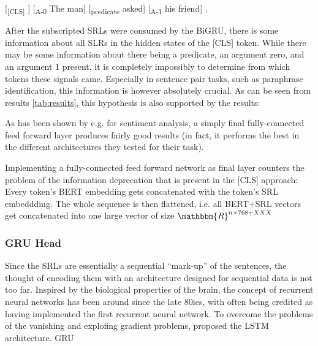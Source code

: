 [\textsubscript{[CLS]} ] [\textsubscript{A-0} The man] [\textsubscript{predicate} asked] [\textsubscript{A-1} his friend] .

After the subscripted SRLs were consumed by the BiGRU, there is some information about all
SLRs in the hidden states of the [CLS] token. While there may be some information about there
being a predicate, an argument zero, and an argument 1 present, it is completely impossibly
to determine from which tokens these signals came. Especially in sentence pair tasks, such
as paraphrase identification, this information is however absolutely crucial. As can be seen
from results \ref{tab:results}, this hypothesis is also supported by the results:


As has been shown by e.g. \cite{myagmar2019transferable} for sentiment analysis, a simply final
fully-connected feed forward layer produces fairly good results (in fact, it performs the best
in the different architectures they tested for their task).

Implementing a fully-connected feed forward network as final layer counters the problem of the
information deprecation that is present in the [CLS] approach: Every token's BERT embedding gets
concatenated with the token's SRL embeddding. The whole sequence is then flattened, i.e. all
BERT+SRL vectors get concatenated into one large vector of size $\mathbbm{R}^{n\times768+XXX}$


\subsubsection{GRU Head}

Since the SRLs are essentially a sequential ``mark-up'' of the sentences, the thought of
encoding them with an architecture designed for sequential data is not too far. Inspired by
the biological properties of the brain, the concept of recurrent neural networks has been
around since the late 80ies, with \citep{hopfield1982neural} often being credited as having
implemented the first recurrent neural network. To overcome the problems of the vanishing
and explofing gradient problems, \citep{hochreiter1997long} proposed the LSTM architecture.
\citep{cho2014learning} GRU



